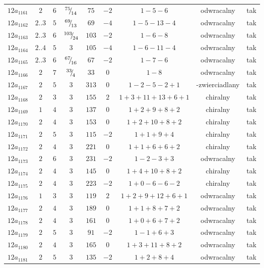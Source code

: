 \begin{longtable}{ccccccccc}
$12a_{1161}$ & $2$ & $6$ & ${}^{75}{\mskip -5mu/\mskip -3mu}_{14}$ & $75$ & $-2$ & $1-5-6$ & odwracalny & tak \\
$12a_{1162}$ & $2..3$ & $5$ & ${}^{69}{\mskip -5mu/\mskip -3mu}_{13}$ & $69$ & $-4$ & $1-5-13-4$ & odwracalny & tak \\
$12a_{1163}$ & $2..3$ & $6$ & ${}^{103}{\mskip -5mu/\mskip -3mu}_{24}$ & $103$ & $-2$ & $1-6-8$ & odwracalny & tak \\
$12a_{1164}$ & $2..4$ & $5$ & $3$ & $105$ & $-4$ & $1-6-11-4$ & odwracalny & tak \\
$12a_{1165}$ & $2..3$ & $6$ & ${}^{67}{\mskip -5mu/\mskip -3mu}_{16}$ & $67$ & $-2$ & $1-7-6$ & odwracalny & tak \\
$12a_{1166}$ & $2$ & $7$ & ${}^{33}{\mskip -5mu/\mskip -3mu}_{4}$ & $33$ & $0$ & $1-8$ & odwracalny & tak \\
$12a_{1167}$ & $2$ & $5$ & $3$ & $313$ & $0$ & $1-2-5-2+1$ & -zwierciadlany & tak \\
$12a_{1168}$ & $2$ & $3$ & $3$ & $155$ & $2$ & $1+3+11+13+6+1$ & chiralny & tak \\
$12a_{1169}$ & $1$ & $4$ & $3$ & $137$ & $0$ & $1+2+9+8+2$ & chiralny & tak \\
$12a_{1170}$ & $2$ & $4$ & $3$ & $153$ & $0$ & $1+2+10+8+2$ & chiralny & tak \\
$12a_{1171}$ & $2$ & $5$ & $3$ & $115$ & $-2$ & $1+1+9+4$ & chiralny & tak \\
$12a_{1172}$ & $2$ & $4$ & $3$ & $221$ & $0$ & $1+1+6+6+2$ & chiralny & tak \\
$12a_{1173}$ & $2$ & $6$ & $3$ & $231$ & $-2$ & $1-2-3+3$ & odwracalny & tak \\
$12a_{1174}$ & $2$ & $4$ & $3$ & $145$ & $0$ & $1+4+10+8+2$ & chiralny & tak \\
$12a_{1175}$ & $2$ & $4$ & $3$ & $223$ & $-2$ & $1+0-6-6-2$ & chiralny & tak \\
$12a_{1176}$ & $1$ & $3$ & $3$ & $119$ & $2$ & $1+2+9+12+6+1$ & odwracalny & tak \\
$12a_{1177}$ & $2$ & $4$ & $3$ & $189$ & $0$ & $1+1+8+7+2$ & odwracalny & tak \\
$12a_{1178}$ & $2$ & $4$ & $3$ & $161$ & $0$ & $1+0+6+7+2$ & odwracalny & tak \\
$12a_{1179}$ & $2$ & $5$ & $3$ & $91$ & $-2$ & $1-1+6+3$ & odwracalny & tak \\
$12a_{1180}$ & $2$ & $4$ & $3$ & $165$ & $0$ & $1+3+11+8+2$ & odwracalny & tak \\
$12a_{1181}$ & $2$ & $5$ & $3$ & $135$ & $-2$ & $1+2+8+4$ & odwracalny & tak \\

\end{longtable}
